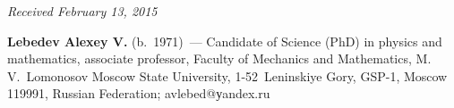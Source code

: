 \vspace*{-3pt}

\hfill{\small\textit{Received February 13, 2015}}


\Contrl

\noindent
\textbf{Lebedev Alexey V.} (b.\ 1971)~---
Candidate of Science (PhD) in physics and mathematics, associate professor,
Faculty of Mechanics and Mathematics, M.\,V.~Lomonosov Moscow State
University, 1-52~Leninskiye Gory, GSP-1, Moscow 119991, Russian Federation;
avlebed@уandex.ru
\label{end\stat}


\renewcommand{\bibname}{\protect\rm Литература}